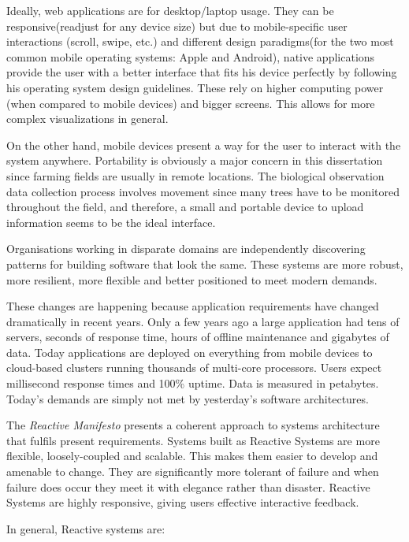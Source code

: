 Ideally, web applications are for desktop/laptop usage. They can be responsive(readjust for any device size) but due to mobile-specific user interactions (scroll, swipe, etc.) and different design paradigms(for the two most common mobile operating systems: Apple and Android), native applications provide the user with a better interface that fits his device perfectly by following his operating system design guidelines. These rely on higher computing power (when compared to mobile devices) and bigger screens. This allows for more complex visualizations in general. 

On the other hand, mobile devices present a way for the user to interact with the system anywhere. Portability is obviously a major concern in this dissertation since farming fields are usually in remote locations. The biological observation data collection process involves movement since many trees have to be monitored throughout the field, and therefore, a small and portable device to upload information seems to be the ideal interface.

Organisations working in disparate domains are independently discovering patterns for building software that look the same. These systems are more robust, more resilient, more flexible and better positioned to meet modern demands.

These changes are happening because application requirements have changed dramatically in recent years. Only a few years ago a large application had tens of servers, seconds of response time, hours of offline maintenance and gigabytes of data. Today applications are deployed on everything from mobile devices to cloud-based clusters running thousands of multi-core processors. Users expect millisecond response times and 100\% uptime. Data is measured in petabytes. Today's demands are simply not met by yesterday’s software architectures.

The \textit{Reactive Manifesto} presents a coherent approach to systems architecture that fulfils present requirements. Systems built as Reactive Systems are more flexible, loosely-coupled and scalable. This makes them easier to develop and amenable to change. They are significantly more tolerant of failure and when failure does occur they meet it with elegance rather than disaster. Reactive Systems are highly responsive, giving users effective interactive feedback.

In general, Reactive systems are:

